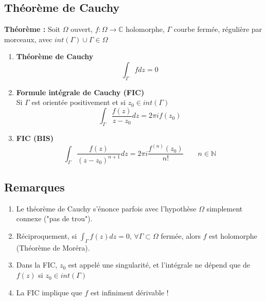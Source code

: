\subsection{Théorème de Cauchy}
\textbf{Théorème :} Soit $\Omega$ ouvert, $f : \Omega\to\mathbb{C}$ holomorphe, $\Gamma$ courbe fermée, régulière par morceaux, avec $int(\Gamma) \cup \Gamma \in \Omega$
\begin{enumerate}
    \item \textbf{Théorème de Cauchy}
    $$\int_{\Gamma}fdz = 0$$
    \item \textbf{Formule intégrale de Cauchy (FIC)}\\
    Si $\Gamma$ est orientée positivement et si $z_0\in int(\Gamma)$
    $$\int_{\Gamma}\frac{f(z)}{z-z_0}dz = 2\pi i f(z_0)$$
    \item \textbf{FIC (BIS)}
    $$\int_{\Gamma}\frac{f(z)}{(z-z_0)^{n+1}}dz = 2\pi i \frac{f^{(n)}(z_0)}{n!} \quad\quad n\in\mathbb{N}$$
\end{enumerate}

\subsection{Remarques}
\begin{enumerate}
    \item Le théorème de Cauchy s'énonce parfois avec l'hypothèse $\Omega$ simplement connexe ("pas de trou").
    \item Réciproquement, si $\int_{\Gamma}f(z)dz = 0$, $\forall\Gamma\subset\Omega$ fermée, alors $f$ est holomorphe (Théorème de Moréra).
    \item Dans la FIC, $z_0$ est appelé une singularité, et l'intégrale ne dépend que de $f(z)$ si $z_0\in int(\Gamma)$
    \item La FIC implique que $f$ est infiniment dérivable !
\end{enumerate}